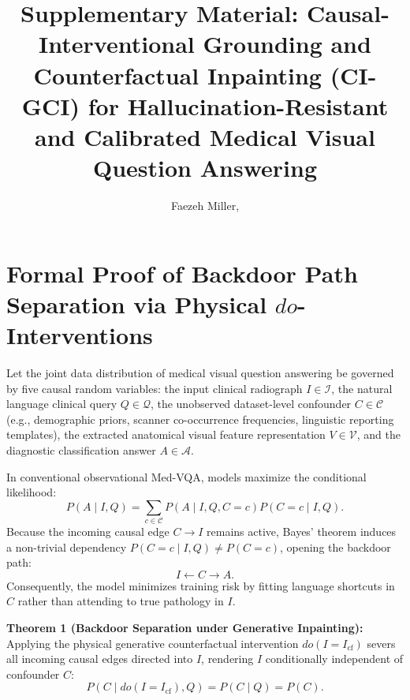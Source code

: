 \documentclass[journal,twocolumn,letterpaper]{IEEEtran}
\title{Supplementary Material: Causal-Interventional Grounding and Counterfactual Inpainting (CI-GCI) for Hallucination-Resistant and Calibrated Medical Visual Question Answering}
\author{Faezeh Miller, \IEEEmembership{Graduate Student Member, IEEE}}
\begin{document}
\maketitle

\appendices

\section{Formal Proof of Backdoor Path Separation via Physical $do$-Interventions}
\label{sec:proof_backdoor}

Let the joint data distribution of medical visual question answering be governed by five causal random variables: the input clinical radiograph $I \in \mathcal{I}$, the natural language clinical query $Q \in \mathcal{Q}$, the unobserved dataset-level confounder $C \in \mathcal{C}$ (e.g., demographic priors, scanner co-occurrence frequencies, linguistic reporting templates), the extracted anatomical visual feature representation $V \in \mathcal{V}$, and the diagnostic classification answer $A \in \mathcal{A}$.

In conventional observational Med-VQA, models maximize the conditional likelihood:
\begin{equation}
P(A \mid I, Q) = \sum_{c \in \mathcal{C}} P(A \mid I, Q, C=c) P(C=c \mid I, Q).
\label{eq:obs_confounding}
\end{equation}
Because the incoming causal edge $C \rightarrow I$ remains active, Bayes' theorem induces a non-trivial dependency $P(C=c \mid I, Q) \ne P(C=c)$, opening the backdoor path:
\begin{equation}
I \longleftarrow C \longrightarrow A.
\end{equation}
Consequently, the model minimizes training risk by fitting language shortcuts in $C$ rather than attending to true pathology in $I$.

\noindent\textbf{Theorem 1 (Backdoor Separation under Generative Inpainting):} 
Applying the physical generative counterfactual intervention $do(I = I_{\text{cf}})$ severs all incoming causal edges directed into $I$, rendering $I$ conditionally independent of confounder $C$:
\begin{equation}
P(C \mid do(I=I_{\text{cf}}), Q) = P(C \mid Q) = P(C).
\end{equation}
\end{document}

